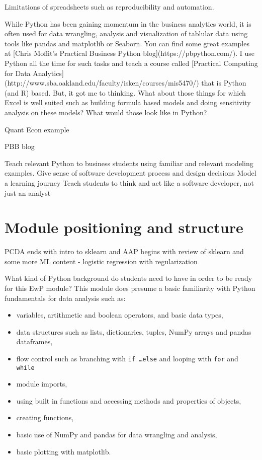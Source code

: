 \documentclass[ited,blindrev]{informs3}              %
\begin{document}
Limitations of spreadsheets such as reproducibility and automation.


While Python has been gaining momentum in the business analytics world, it is often used for data wrangling, analysis and visualization of tablular data using tools like pandas and matplotlib or Seaborn. You can find some great examples at [Chris Moffit's Practical Business Python blog](https://pbpython.com/). I use Python all the time for such tasks and teach a course called [Practical Computing for Data Analytics](http://www.sba.oakland.edu/faculty/isken/courses/mis5470/) that is Python (and R) based. But, it got me to thinking. What about those things for which Excel is well suited such as building formula based models and doing sensitivity analysis on these models? What would those look like in Python?

Quant Econ example

PBB blog


Teach relevant Python to business students using familiar and relevant modeling examples.
Give sense of software development process and design decisions
Model a learning journey
Teach students to think and act like a software developer, not just an analyst

\section{Module positioning and structure}

PCDA ends with intro to sklearn and AAP begins with review of sklearn and some more ML content - logistic regression with regularization

What kind of Python background do students need to have in order to be ready for this EwP module? This module does presume a basic familiarity with Python fundamentals for data analysis such as:

\begin{itemize}
	\item variables, artithmetic and boolean operators, and basic data types,
	\item data structures such as lists, dictionaries, tuples, NumPy arrays and pandas dataframes,
	\item flow control such as branching with \texttt{if \ldots else} and looping with \texttt{for} and \texttt{while}
	\item module imports,
	\item using built in functions and accessing methods and properties of objects,
	\item creating functions,
	\item basic use of NumPy and pandas for data wrangling and analysis,
	\item basic plotting with matplotlib.
\end{itemize}
\end{document}
